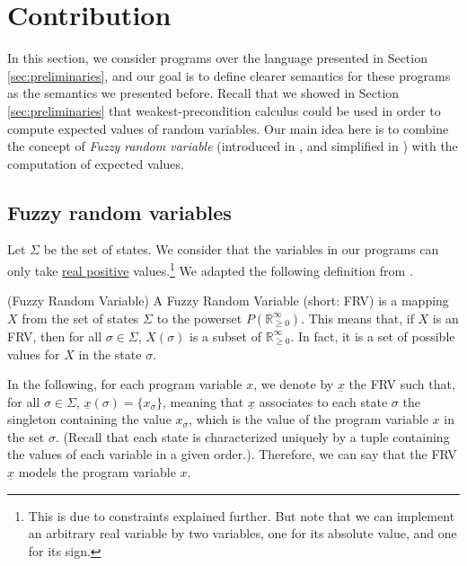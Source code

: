 \documentclass[a4paper,10pt]{llncs}
\def\RRposi {{\mathbb R_{\geq 0}^{\infty}}}
\begin{document}
\section{Contribution}
\label{sec:contribution}

In this section, we consider programs over the language presented in Section \ref{sec:preliminaries}, and our goal is to define clearer semantics for these programs as the semantics we presented before. Recall that we showed in Section \ref{sec:preliminaries} that weakest-precondition calculus could be used in order to compute expected values of random variables. Our main idea here is to combine the concept of \textit{Fuzzy random variable} (introduced in \cite{PuriRal86}, and simplified in \cite{Shapiro09}) with the computation of expected values.\newline

\subsection{Fuzzy random variables}
Let $\Sigma$ be the set of states. We consider that the variables in our programs can only take \underline{real positive} values.\footnote{This is due to constraints explained further. But note that we can implement an arbitrary real variable by two variables, one for its absolute value, and one for its sign.} We adapted the following definition from \cite{PuriRal86}.

\begin{definition}{\textnormal{(Fuzzy Random Variable)\newline}}
 A Fuzzy Random Variable (short: FRV) is a mapping $X$ from the set of states $\Sigma$ to the powerset $P(\RRposi)$. This means that, if $X$ is an FRV, then for all $\sigma \in \Sigma$, $X(\sigma)$ is a subset of $\RRposi$. In fact, it is a set of possible values for $X$ in the state $\sigma$.
\end{definition}
\begin{example}
 In the following, for each program variable $x$, we denote by $\underline{x}$ the FRV such that, for all $\sigma \in \Sigma$, $\underline{x}(\sigma) = \{ x_{\sigma} \}$, meaning that $\underline{x}$ associates to each state $\sigma$ the singleton containing the value $x_\sigma$, which is the value of the program variable $x$ in the set $\sigma$. (Recall that each state is characterized uniquely by a tuple containing the values of each variable in a given order.). Therefore, we can say that the FRV $\underline{x}$ models the program variable $x$.
\end{example}
\end{document}
